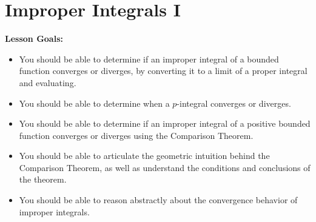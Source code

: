 \documentclass[main]{subfiles}
\begin{document}
\ifSubfilesClassLoaded{%
  \chaptermark{\chapterone}
}{}

\section{Improper Integrals I} \label{ws1-9}
\begin{framed}
\textbf{Lesson Goals:}
\begin{itemize}
\item You should be able to determine if an improper integral of a bounded function converges or diverges, by converting it to a limit of a proper integral and evaluating.
\item You should be able to determine when a $p$-integral converges or diverges.
\item You should be able to determine if an improper integral of a positive bounded function converges or diverges using the Comparison Theorem.
\item You should be able to articulate the geometric intuition behind the Comparison Theorem, as well as understand the conditions and conclusions of the theorem.
\item You should be able to reason abstractly about the convergence behavior of improper integrals.
\end{itemize}
\end{framed}
\end{document}
